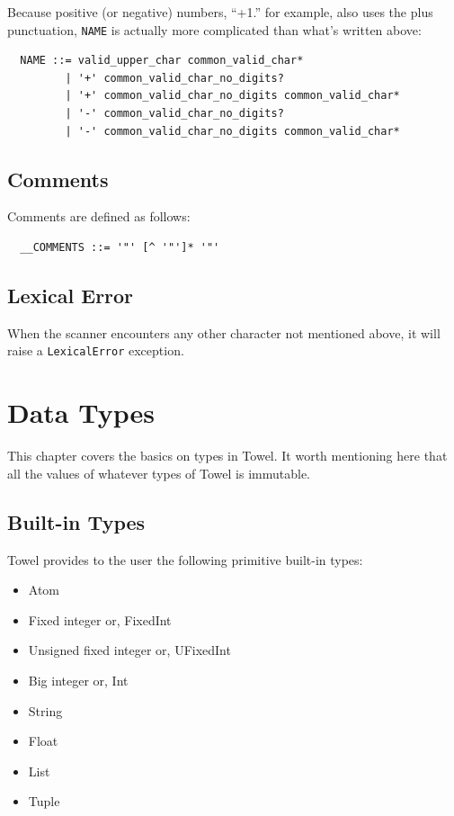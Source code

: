 \documentclass{report}
\begin{document}
\begin{mdframed}[style=detail]
Because positive (or negative) numbers, ``+1.'' for example, also uses the plus punctuation, \texttt{NAME} is actually more complicated than what's written above:
\begin{verbatim}
  NAME ::= valid_upper_char common_valid_char*
         | '+' common_valid_char_no_digits?
         | '+' common_valid_char_no_digits common_valid_char*
         | '-' common_valid_char_no_digits?
         | '-' common_valid_char_no_digits common_valid_char*
\end{verbatim}
\end{mdframed}

\section{Comments}

Comments are defined as follows:
\begin{verbatim}
  __COMMENTS ::= '"' [^ '"']* '"'
\end{verbatim}

\section{Lexical Error}

When the scanner encounters any other character not mentioned above, it will raise a \texttt{LexicalError} exception.

\chapter{Data Types}
\label{chap:data-types}

This chapter covers the basics on types in Towel. It worth mentioning here that all the values of whatever types of Towel is immutable.

\section{Built-in Types}

Towel provides to the user the following primitive built-in types:
\begin{itemize}
\item Atom
\item Fixed integer or, FixedInt
\item Unsigned fixed integer or, UFixedInt
\item Big integer or, Int
\item String
\item Float
\item List
\item Tuple
\end{itemize}
\end{document}
